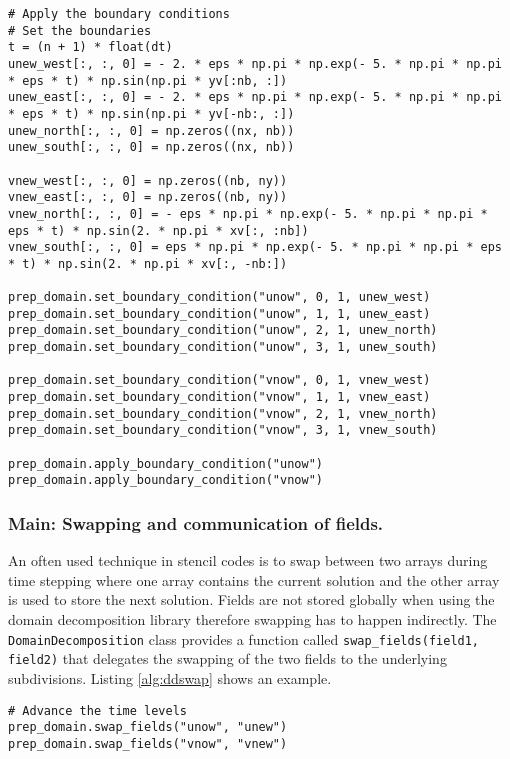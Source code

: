 \begin{lstlisting}[caption={Example code of handling the global boundary condition.},captionpos=b, label={alg:ddbc}, float, floatplacement=H]
# Apply the boundary conditions
# Set the boundaries
t = (n + 1) * float(dt)
unew_west[:, :, 0] = - 2. * eps * np.pi * np.exp(- 5. * np.pi * np.pi * eps * t) * np.sin(np.pi * yv[:nb, :])
unew_east[:, :, 0] = - 2. * eps * np.pi * np.exp(- 5. * np.pi * np.pi * eps * t) * np.sin(np.pi * yv[-nb:, :])
unew_north[:, :, 0] = np.zeros((nx, nb))
unew_south[:, :, 0] = np.zeros((nx, nb))

vnew_west[:, :, 0] = np.zeros((nb, ny))
vnew_east[:, :, 0] = np.zeros((nb, ny))
vnew_north[:, :, 0] = - eps * np.pi * np.exp(- 5. * np.pi * np.pi * eps * t) * np.sin(2. * np.pi * xv[:, :nb])
vnew_south[:, :, 0] = eps * np.pi * np.exp(- 5. * np.pi * np.pi * eps * t) * np.sin(2. * np.pi * xv[:, -nb:])

prep_domain.set_boundary_condition("unow", 0, 1, unew_west)
prep_domain.set_boundary_condition("unow", 1, 1, unew_east)
prep_domain.set_boundary_condition("unow", 2, 1, unew_north)
prep_domain.set_boundary_condition("unow", 3, 1, unew_south)

prep_domain.set_boundary_condition("vnow", 0, 1, vnew_west)
prep_domain.set_boundary_condition("vnow", 1, 1, vnew_east)
prep_domain.set_boundary_condition("vnow", 2, 1, vnew_north)
prep_domain.set_boundary_condition("vnow", 3, 1, vnew_south)

prep_domain.apply_boundary_condition("unow")
prep_domain.apply_boundary_condition("vnow")
\end{lstlisting}

\subsubsection{Main: Swapping and communication of fields.}
An often used technique in stencil codes is to swap between two arrays during time stepping where one array contains the current solution and the other array is used to store the next solution.
Fields are not stored globally when using the domain decomposition library therefore swapping has to happen indirectly.
The \texttt{DomainDecomposition} class provides a function called \texttt{swap\_fields(field1, field2)} that delegates the swapping of the two fields to the underlying subdivisions.
Listing \ref{alg:ddswap} shows an example.

\begin{lstlisting}[caption={Example swapping two arrays in the domain decomposition libarary},captionpos=b, label={alg:ddswap}, float, floatplacement=H]
# Advance the time levels
prep_domain.swap_fields("unow", "unew")
prep_domain.swap_fields("vnow", "vnew")
\end{lstlisting}


